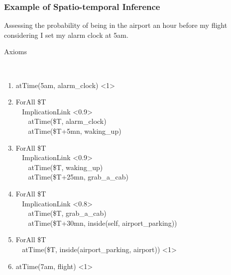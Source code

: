 \documentclass{beamer}
\begin{document}

\frame
{
  \frametitle{Example of Spatio-temporal Inference}

  Assessing the
  \alert{probability of being in the airport an hour before my flight}
  considering I set my \alert{alarm clock at 5am}.
  \pause
  \begin{beamerboxesrounded}{Axioms}
    {\tiny
    {\tt
    \begin{enumerate}
    \item<+-> atTime(5am, alarm\_clock) <1>
    \item<+-> ForAll \$T\\
      $\ \ \ \ $ImplicationLink <0.9>\\
      $\ \ \ \ \ \ \ \ $atTime(\$T, alarm\_clock)\\
      $\ \ \ \ \ \ \ \ $atTime(\$T+5mn, waking\_up)\\
    \item<+-> ForAll \$T\\
      $\ \ \ \ $ImplicationLink <0.9>\\
      $\ \ \ \ \ \ \ \ $atTime(\$T, waking\_up)\\
      $\ \ \ \ \ \ \ \ $atTime(\$T+25mn, grab\_a\_cab)\\
    \item<+-> ForAll \$T\\
      $\ \ \ \ $ImplicationLink <0.8>\\
      $\ \ \ \ \ \ \ \ $atTime(\$T, grab\_a\_cab)\\
      $\ \ \ \ \ \ \ \ $atTime(\$T+30mn, inside(self, airport\_parking))\\
    \item<+-> ForAll \$T\\
      $\ \ \ \ $atTime(\$T, inside(airport\_parking, airport)) <1>\\
    \item<+-> atTime(7am, flight) <1>
    \end{enumerate}
    }
    }
  \end{beamerboxesrounded}

}
\end{document}
